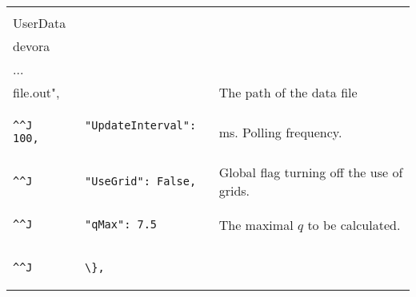 \documentclass[12pt,a4paper,openany,oneside,oldfontcommands]{memoir}
\begin{document}
\begin{tabularx}{\textwidth}{p{8cm} X}
\begin{lstlisting}^^J        "SignalFile": "D:\\UserData\\devora\\...\\file.out",\end{lstlisting}    & The path of the data file \\
\begin{lstlisting}^^J        "UpdateInterval": 100,\end{lstlisting}    & ms. Polling frequency. \\
\begin{lstlisting}^^J        "UseGrid": False,\end{lstlisting}    & Global flag turning off the use of grids. \\
\begin{lstlisting}^^J        "qMax": 7.5\end{lstlisting}    & The maximal $q$ to be calculated. \\
\begin{lstlisting}^^J        \},\end{lstlisting}    & \\
	\bottomrule
\end{tabularx}
\end{document}
